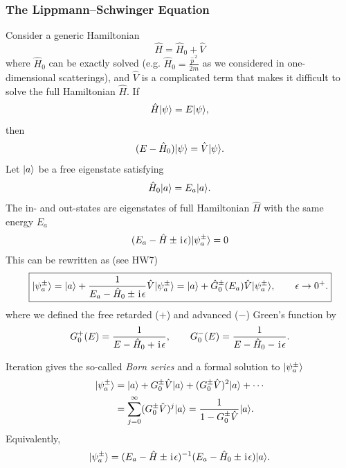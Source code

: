\subsubsection{The Lippmann--Schwinger Equation}
Consider a generic Hamiltonian
\begin{equation}
 \hat H=\hat H_0+\hat V
\end{equation}
where $\hat H_0$ can be exactly solved (e.g. $\hat H_0=\frac{\hat p^{\,2}}{2m}$ as we considered in one-dimensional scatterings), and $\hat V$ is a complicated term that makes it difficult to solve the full Hamiltonian $\hat H$.  
If
\begin{equation}
 \hat H|{\psi}\rangle=E|{\psi}\rangle,
\end{equation}
then
\begin{equation}
 (E-\hat H_0)|{\psi}\rangle=\hat V|{\psi}\rangle.
\end{equation}
Let $|{a}\rangle$ be a free eigenstate satisfying
\begin{equation}
 \hat H_0|{a}\rangle=E_a|{a}\rangle.
\end{equation}
The in- and out-states are eigenstates of full Hamiltonian $\hat H$ with the same energy $E_a$
\begin{align}
    (E_a-\hat H\pm\hspace{1pt}\mathrm{i}\hspace{1pt}\epsilon)|{\psi^\pm_a}\rangle=0
\end{align}
This can be rewritten as (see HW7)
\begin{equation}\label{Lipmann-Schwinger equation}
 \boxed{
 |{\psi_a^\pm}\rangle
 =|{a}\rangle+\frac{1}{E_a-\hat H_0\pm\hspace{1pt}\mathrm{i}\hspace{1pt}\epsilon}
 \hat V|{\psi_a^\pm}\rangle=|{a}\rangle+\hat G_0^\pm(E_a)\hat V|{\psi_a^\pm}\rangle,
 \qquad \epsilon\to0^+.}
\end{equation}
where we defined the free retarded ($+$) and advanced ($-$) Green's function by
\begin{equation}
 G_0^+(E)=\frac{1}{E-\hat H_0+\hspace{1pt}\mathrm{i}\hspace{1pt}\epsilon},
 \qquad
 G_0^-(E)=\frac{1}{E-\hat H_0-\hspace{1pt}\mathrm{i}\hspace{1pt}\epsilon}.
\end{equation}

Iteration gives the so-called \emph{Born series} and a formal solution to $|{\psi_a^\pm}\rangle$
\begin{align}
 |{\psi_a^\pm}\rangle
 &=|{a}\rangle+G_0^\pm\hat V|{a}\rangle
 +(G_0^\pm\hat V)^2|{a}\rangle+\cdots\\
 &=\sum_{j=0}^{\infty}(G_0^\pm\hat V)^j|{a}\rangle=\frac{1}{1-G_0^\pm\hat V}|{a}\rangle.
\end{align}
Equivalently,
\begin{equation}
 |{\psi_a^\pm}\rangle
 =(E_a-\hat H\pm\hspace{1pt}\mathrm{i}\hspace{1pt}\epsilon)^{-1}
 (E_a-\hat H_0\pm\hspace{1pt}\mathrm{i}\hspace{1pt}\epsilon)|{a}\rangle.
\end{equation}

